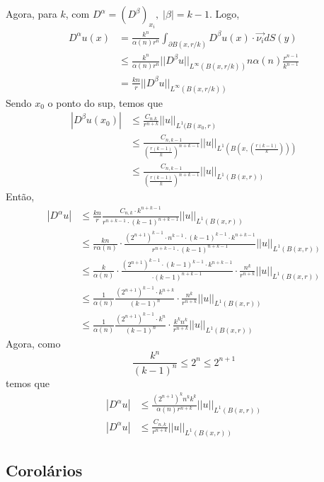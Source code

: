 \documentclass[11pt]{article}
\begin{document}
Agora, para \( k \), com \( D^\alpha = ( D^\beta )_{x_i},   \;  |\beta| = k-1 \). Logo, \begin{align*}
	 D^\alpha u(x) &= \frac{k^n}{\alpha (n) r^n} \int_{\partial B(x, r/k)} D^\beta u(x) \cdot \vec{\nu_{i}} dS(y) \\
	 &\leq \frac{k^n}{\alpha (n) r^n} || D^\beta u ||_{L^\infty (B(x, r/k))} n \alpha(n) \frac{r^{n-1}}{k^{n-1}} \\
	 &= \frac{k n}{r} || D^\beta u ||_{L^\infty (B(x, r/k))}
\end{align*} Sendo \( x_0 \) o ponto do sup, temos que \begin{align*}
	 | D^\beta u(x_0) | &\leq \frac{C_{n.k}}{r^{n+k}} || u ||_{L^1 (B(x_0, r)} \\
	  &\leq \frac{C_{n,k-1}}{\left ( \frac{r(k-1)}{k} \right ) ^{n+k-1}} ||u ||_{L^1 (B(x, \left ( \frac{r(k-1)}{k} \right ) ))} \\
	 &\leq \frac{C_{n,k-1}}{\left ( \frac{r(k-1)}{k} \right ) ^{n+k-1}} ||u ||_{L^1 (B(x,r))}
\end{align*}
Então, \begin{align*}
	 |D^\alpha u| &\leq \frac{kn}{r} \frac{C_{n,k} \cdot k^{n+k-1} }{ r^{n+k-1} \cdot (k-1)^{n+k-1} } ||u ||_{ L^1 (B(x,r)) } \\
	&\leq \frac{kn}{r \alpha(n)} \cdot \frac {(2^{n+1})^{k-1} \cdot n^{k-1} \cdot (k-1)^{k-1} \cdot k^{n+k-1} }{r^{n+k-1} \cdot (k-1)^{n+k-1} } ||u ||_{ L^1 (B(x,r)) } \\
	 &\leq \frac{k}{\alpha (n)} \cdot\frac {(2^{n+1})^{k-1} \cdot (k-1)^{k-1} \cdot k^{n+k-1} }{\cdot (k-1)^{n+k-1} } \cdot \frac{ n^k }{r^{n+k}}  ||u ||_{ L^1 (B(x,r)) } \\
	 &\leq \frac{1}{\alpha (n)} \frac {(2^{n+1})^{k-1} \cdot k^{n+k} }{(k-1)^{n} } \cdot \frac{ n^k }{r^{n+k}}  ||u ||_{ L^1 (B(x,r)) } \\
	 &\leq \frac{1}{\alpha (n)}  \frac {(2^{n+1})^{k-1} \cdot k^{n} }{(k-1)^{n} } \cdot \frac{ k^k n^k }{r^{n+k}}  ||u ||_{ L^1 (B(x,r)) } 
\end{align*}
Agora, como \[ \frac{k^n}{(k-1)^n} \leq 2^n \leq 2^{n+1} \] temos que \begin{align*}
	| D^\alpha u | &\leq \frac{ (2^{n+1})^{k} n^k k^k }{\alpha (n) r^{n+k}} ||u ||_{L^1 (B(x,r))}\\
	 | D^\alpha u | &\leq \frac{ C_{n,k} }{r^{n+k}} ||u ||_{L^1 (B(x,r))} 
\end{align*}




\subsection{Corolários}
\end{document}
